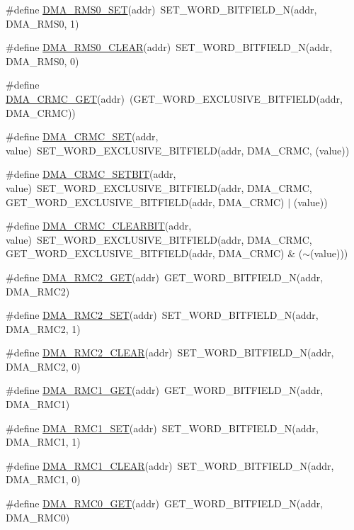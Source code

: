 \begin{DoxyCompactItemize}
\item 
\#define \hyperlink{a00548_af01cf37d6a84fc67cbb6d0af265b9134}{DMA\_\-RMS0\_\-SET}(addr)~SET\_\-WORD\_\-BITFIELD\_\-N(addr, DMA\_\-RMS0, 1)
\item 
\#define \hyperlink{a00548_aa92e745c7a4342d38933f9bb81337d1c}{DMA\_\-RMS0\_\-CLEAR}(addr)~SET\_\-WORD\_\-BITFIELD\_\-N(addr, DMA\_\-RMS0, 0)
\item 
\#define \hyperlink{a00548_a6135e6905edc5f9a913e95e57c3b5b33}{DMA\_\-CRMC\_\-GET}(addr)~(GET\_\-WORD\_\-EXCLUSIVE\_\-BITFIELD(addr, DMA\_\-CRMC))
\item 
\#define \hyperlink{a00548_ae6a9fc60182aaa29027e9888b4236f16}{DMA\_\-CRMC\_\-SET}(addr, value)~SET\_\-WORD\_\-EXCLUSIVE\_\-BITFIELD(addr, DMA\_\-CRMC, (value))
\item 
\#define \hyperlink{a00548_ac16b4596853d4a2c9623ac5d8f14cff9}{DMA\_\-CRMC\_\-SETBIT}(addr, value)~SET\_\-WORD\_\-EXCLUSIVE\_\-BITFIELD(addr, DMA\_\-CRMC, GET\_\-WORD\_\-EXCLUSIVE\_\-BITFIELD(addr, DMA\_\-CRMC) $|$ (value))
\item 
\#define \hyperlink{a00548_adede5a3763b5950ea2271757eca51612}{DMA\_\-CRMC\_\-CLEARBIT}(addr, value)~SET\_\-WORD\_\-EXCLUSIVE\_\-BITFIELD(addr, DMA\_\-CRMC, GET\_\-WORD\_\-EXCLUSIVE\_\-BITFIELD(addr, DMA\_\-CRMC) \& ($\sim$(value)))
\item 
\#define \hyperlink{a00548_a572273adc2b054690d82f7d0ea842945}{DMA\_\-RMC2\_\-GET}(addr)~GET\_\-WORD\_\-BITFIELD\_\-N(addr, DMA\_\-RMC2)
\item 
\#define \hyperlink{a00548_ad7b812ee3d9158b52f8848cf8eefd03d}{DMA\_\-RMC2\_\-SET}(addr)~SET\_\-WORD\_\-BITFIELD\_\-N(addr, DMA\_\-RMC2, 1)
\item 
\#define \hyperlink{a00548_a2686543b586c17ef646bdf8a8cd7589f}{DMA\_\-RMC2\_\-CLEAR}(addr)~SET\_\-WORD\_\-BITFIELD\_\-N(addr, DMA\_\-RMC2, 0)
\item 
\#define \hyperlink{a00548_afd6a33a9ad2fd40ca1c8367b4081fd86}{DMA\_\-RMC1\_\-GET}(addr)~GET\_\-WORD\_\-BITFIELD\_\-N(addr, DMA\_\-RMC1)
\item 
\#define \hyperlink{a00548_a896f1f2b4fd36790fdd1724db11af9bf}{DMA\_\-RMC1\_\-SET}(addr)~SET\_\-WORD\_\-BITFIELD\_\-N(addr, DMA\_\-RMC1, 1)
\item 
\#define \hyperlink{a00548_aba25198ba7aa003a855d63a6225eb4c0}{DMA\_\-RMC1\_\-CLEAR}(addr)~SET\_\-WORD\_\-BITFIELD\_\-N(addr, DMA\_\-RMC1, 0)
\item 
\#define \hyperlink{a00548_a060a6ebd83671f9795c0675e7f731d45}{DMA\_\-RMC0\_\-GET}(addr)~GET\_\-WORD\_\-BITFIELD\_\-N(addr, DMA\_\-RMC0)

\end{DoxyCompactItemize}
